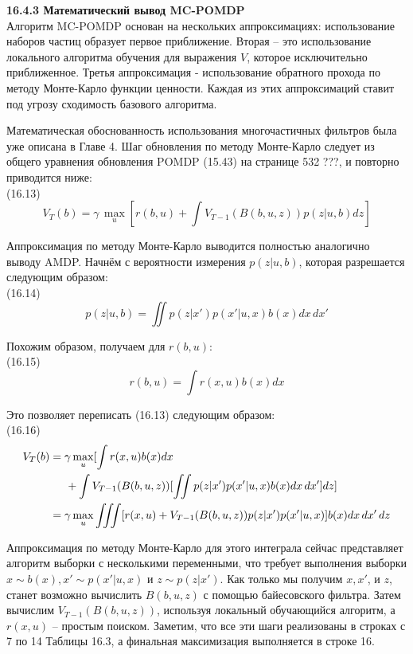 \documentclass[10pt,a4paper]{article}
\begin{document}
\textbf{16.4.3	Математический вывод MC-POMDP}\\

Алгоритм MC-POMDP основан на нескольких аппроксимациях: использование наборов частиц образует первое приближение. Вторая – это использование локального алгоритма обучения для выражения $V$, которое исключительно приближенное. Третья аппроксимация - использование обратного прохода по методу Монте-Карло функции ценности. Каждая из этих аппроксимаций ставит под угрозу сходимость базового алгоритма.

Математическая обоснованность использования многочастичных фильтров была уже описана в Главе 4. Шаг обновления по методу Монте-Карло следует из общего уравнения обновления POMDP (15.43) на странице 532 ???, и повторно приводится ниже:\\

(16.13)
$$V_T(b)=\gamma\,\underset{u}{\max}\left[ r(b,u)+\int V_{T-1}(B(b,u,z))p(z|u,b)dz\right] $$

Аппроксимация по методу Монте-Карло выводится полностью аналогично выводу AMDP. Начнём с вероятности измерения $p(z | u, b)$, которая разрешается следующим образом:\\

(16.14)
$$p(z|u,b)=\iint p(z|x')p(x'|u,x)b(x)dx\,dx'$$

Похожим образом, получаем для $r(b, u)$:\\

(16.15) 
$$r(b,u)=\int r(x,u)b(x)dx$$

Это позволяет переписать (16.13) следующим образом:\\

(16.16)
\begin{equation*}
\begin{split}
V_T(b)&=\gamma\,\underset{u}{\max}[ \int r(x,u)b(x)dx\\
&\hspace{5mm}+\int V_{T-1}(B(b,u,z))[ \iint p(z|x')p(x'|u,x)b(x)dx\,dx'] dz] \\
&=\gamma\,\underset{u}{\max}\iiint[r(x,u)+V_{T-1}(B(b,u,z))p(z|x')p(x'|u,x)]b(x)dx\,dx'\,dz
\end{split}
\end{equation*}

Аппроксимация по методу Монте-Карло для этого интеграла сейчас представляет алгоритм выборки с несколькими переменными, что требует выполнения выборки $x\sim b(x), x'\sim p(x' | u, x)$ и $z\sim p(z|x')$.  Как только мы получим $x, x'$, и $z$, станет возможно вычислить $B(b, u, z)$ с помощью байесовского фильтра. Затем вычислим $V_{T-1}(B(b, u, z))$, используя локальный обучающийся алгоритм, а $r(x, u)$ – простым поиском. Заметим, что все эти шаги реализованы в строках с 7 по 14 Таблицы 16.3, а финальная максимизация выполняется в строке 16.
\end{document}
